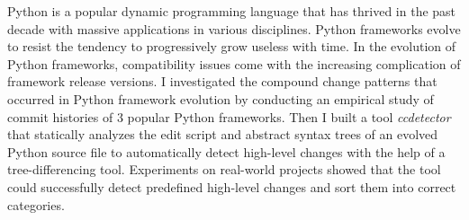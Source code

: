 

\begin{enabstract}

  Python is a popular dynamic programming language that has thrived in the past decade with massive applications in various disciplines. Python frameworks evolve to resist the tendency to progressively grow useless with time. In the evolution of Python frameworks, compatibility issues come with the increasing complication of framework release versions. I investigated the compound change patterns that occurred in Python framework evolution by conducting an empirical study of commit histories of 3 popular Python frameworks. Then I built a tool \textit{ccdetector} that statically analyzes the edit script and abstract syntax trees of an evolved Python source file to automatically detect high-level changes with the help of a tree-differencing tool. Experiments on real-world projects showed that the tool could successfully detect predefined high-level changes and sort them into correct categories.


\end{enabstract}
